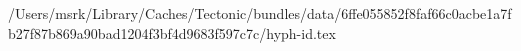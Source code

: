/Users/msrk/Library/Caches/Tectonic/bundles/data/6ffe055852f8faf66c0acbe1a7fb27f87b869a90bad1204f3bf4d9683f597c7c/hyph-id.tex